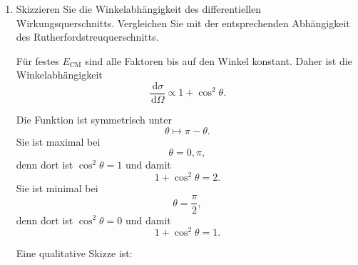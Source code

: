 \documentclass[11pt,a4paper]{scrartcl}
\newcommand{\dd}{\,\mathrm{d}}
\begin{document}
\begin{enumerate}[label=(\alph*)]
        \item
            Skizzieren Sie die Winkelabhängigkeit des differentiellen Wirkungsquerschnitts.
            Vergleichen Sie mit der entsprechenden Abhängigkeit des Rutherfordstreuquerschnitts.

            \begin{calculationbox}
                Für festes $E_{\mathrm{CM}}$ sind alle Faktoren bis auf den Winkel konstant.
                Daher ist die Winkelabhängigkeit
                \[
                    \frac{\dd\sigma}{\dd\Omega}\propto 1+\cos^2\theta.
                \]

                \begin{calculationbox}
                    Die Funktion ist symmetrisch unter
                    \[
                        \theta\mapsto \pi-\theta.
                    \]
                    Sie ist maximal bei
                    \[
                        \theta=0,\pi,
                    \]
                    denn dort ist $\cos^2\theta=1$ und damit
                    \[
                        1+\cos^2\theta=2.
                    \]
                    Sie ist minimal bei
                    \[
                        \theta=\frac{\pi}{2},
                    \]
                    denn dort ist $\cos^2\theta=0$ und damit
                    \[
                        1+\cos^2\theta=1.
                    \]
                \end{calculationbox}

                \begin{calculationbox}
                    Eine qualitative Skizze ist:
                    \begin{center}
                    \end{center}
                \end{calculationbox}


\end{calculationbox}
\end{enumerate}
\end{document}
